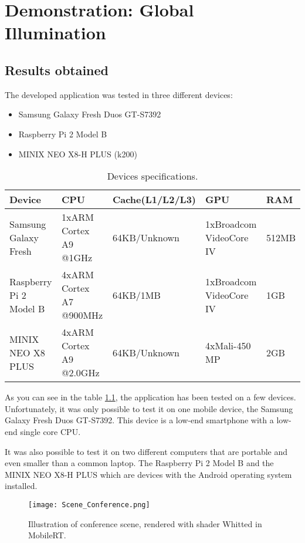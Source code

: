 \chapter{Demonstration: Global Illumination}

\section{Results obtained}
\label{ResultsObtained}

\par
The developed application was tested in three different devices:

\begin{itemize}
	\item Samsung Galaxy Fresh Duos GT-S7392
	\item Raspberry Pi 2 Model B
	\item MINIX NEO X8-H PLUS (k200)
\end{itemize}

\begin{table}[H]
	\small
	\centering
	\caption{Devices specifications.}
	\label{specs}
	\hspace*{-2cm}
	\begin{tabular}{|l|l|l|l|l|}
		\hline
		Device&CPU&Cache(L1/L2/L3)&GPU&RAM\\ \hline
		Samsung Galaxy Fresh&1xARM Cortex A9 @1GHz&64KB/Unknown&1xBroadcom VideoCore IV&512MB\\ \hline
		Raspberry Pi 2 Model B&4xARM Cortex A7 @900MHz&64KB/1MB&1xBroadcom VideoCore IV&1GB\\ \hline
		MINIX NEO X8 PLUS&4xARM Cortex A9 @2.0GHz&64KB/Unknown&4xMali-450 MP&2GB\\ \hline
	\end{tabular}
\end{table}

\par
As you can see in the table \ref{specs}, the application has been tested on a few devices.
Unfortunately, it was only possible to test it on one mobile device, the Samsung Galaxy Fresh Duos GT-S7392.
This device is a low-end smartphone with a low-end single core CPU.

\par
It was also possible to test it on two different computers that are portable and even smaller than a common laptop.
The Raspberry Pi 2 Model B and the MINIX NEO X8-H PLUS which are devices with the Android operating system installed.

\begin{figure}[H]
	\centering
	\caption{Illustration of conference scene, rendered with shader Whitted in MobileRT.}
	\label{scene_conference}
	\texttt{[image: Scene\_Conference.png]}
\end{figure}

